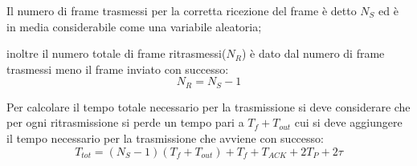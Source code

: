 Il numero di frame trasmessi per la corretta ricezione del frame è detto $N_S$ ed è in media considerabile come una variabile aleatoria;

inoltre il numero totale di frame ritrasmessi($N_R$) è dato dal numero di frame trasmessi meno il frame inviato con successo:
\begin{equation}
N_R = N_S - 1
\end{equation}

Per calcolare il tempo totale necessario per la trasmissione
si deve considerare che per ogni ritrasmissione si perde un
tempo pari a $T_f+T_{out}$ cui si deve aggiungere il tempo
necessario per la trasmissione che avviene con successo:
\begin{equation}
T_{tot} = (N_S - 1)(T_f + T_{out}) + T_f + T_{ACK} + 2T_P + 2\tau
\end{equation}
\newpage

